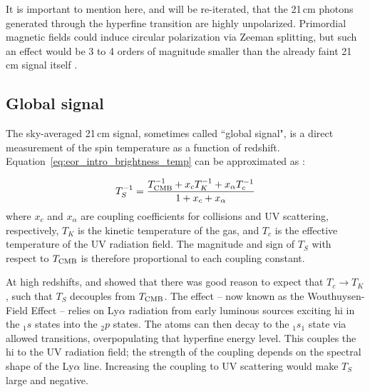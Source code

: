 It is important to mention here, and will be re-iterated, that the 21\,cm photons generated through the hyperfine transition are highly unpolarized. Primordial magnetic fields could induce circular polarization via Zeeman splitting, but such an effect would be 3 to 4 orders of magnitude smaller than the already faint 21\,cm signal itself \citep{Babich.05}.



\subsection{Global signal}

The sky-averaged 21\,cm signal, sometimes called ``global signal", is a direct measurement of the spin temperature as a function of redshift. Equation~\ref{eq:eor_intro_brightness_temp} can be approximated as \citep{Field.56}:

\begin{equation}
T_S^{-1} = \frac{T_{\rm CMB}^{-1} + x_cT_K^{-1} + x_{\alpha}T_c^{-1} }{1 + x_c + x_{\alpha}}
\end{equation}
where $x_c$ and $x_{\alpha}$ are coupling coefficients for collisions and UV scattering, respectively, $T_K$ is the kinetic temperature of the gas, and $T_c$ is the effective temperature of the UV radiation field. The magnitude and sign of $T_S$ with respect to $T_{\rm CMB}$ is therefore proportional to each coupling constant.

At high redshifts, \cite{Wouthuysen.52} and \cite{Field.59} showed that there was good reason to expect that $T_c \rightarrow T_K$, such that $T_S$ decouples from $T_{\rm CMB}$. The effect -- now known as the Wouthuysen-Field Effect -- relies on Ly$\alpha$ radiation from early luminous sources exciting {\sc hi} in the ${}_1s$ states into the ${}_2p$ states. The atoms can then decay to the  ${}_1s_1$ state via allowed transitions, overpopulating that hyperfine energy level. This couples the {\sc hi} to the UV radiation field; the strength of the coupling depends on the spectral shape of the Ly$\alpha$ line. Increasing the coupling to UV scattering would make $T_S$ large and negative.

